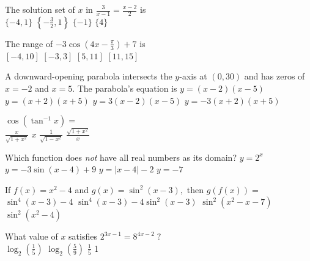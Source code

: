 \begin{question}
The solution set of \(x\) in \(\frac{3}{x - 1} = \frac{x - 2}{2}\) is \\
\choicesline
{\(\{-4, 1\}\)}
{\(\left\{-\frac{3}{2}, 1\right\}\)}
{}
{\(\{-1\}\)}
{\(\{4\}\)}
\end{question}

\begin{question}
The range of \(-3 \cos \left(4x - \frac{\pi}{3}\right) + 7\) is \\
\choicesline
{\([-4, 10]\)}
{\([-3, 3]\)}
{\ans{\([4, 10]\)}}
{\([5, 11]\)}
{\([11, 15]\)}
\end{question}

\begin{question}
A downward-opening parabola intersects the \(y\)-axis at \((0, 30)\) and has zeros of \(x = -2\) and \(x = 5.\) The parabola's equation is 
\choices
{\(y = (x - 2)(x - 5)\)}
{\(y = (x + 2)(x + 5)\)}
{\(y = 3(x - 2)(x - 5)\)}
{\(y = -3(x + 2)(x + 5)\)}
{}
\end{question}

\begin{question}
\(\cos \left(\tan^{-1} x\right) =\) \\
\choicesline
{\(\frac{x}{\sqrt{1 + x^2}}\)}
{\(x\)}
{}
{\(\frac{1}{\sqrt{1 - x^2}}\)}
{\(\frac{\sqrt{1 + x^2}}{x}\)}
\end{question}

\begin{question}
Which function does \emph{not} have all real  numbers as its domain?
\choices
{}
{\(y = 2^x\)}
{\(y = -3 \sin(x - 4) + 9\)}
{\(y = |x - 4| - 2\)}
{\(y = -7\)}
\end{question}

\begin{question}
If \(f(x) = x^2 - 4\) and \(g(x) = \sin^2(x - 3),\) then \(g(f(x)) =\) \\ 
\choices
{\(\sin^4(x - 3) - 4\)}
{}
{\(\sin^4(x - 3) - 4 \sin^2(x - 3)\)}
{\(\sin^2(x^2 - x - 7)\)}
{\(\sin^2(x^2 - 4)\)}
\end{question}

\begin{question}
What value of \(x\) satisfies \(2^{3x - 1} = 8^{4x - 2} \; ?\) \\
\choicesline
{\(\log_2 \left(\frac{1}{5}\right)\)}
{\(\log_2 \left(\frac{5}{9}\right)\)}
{\(\frac{1}{5}\)}
{}
{1}
\end{question}

